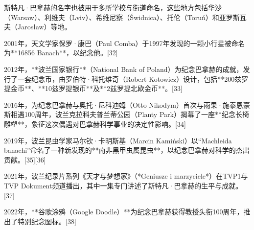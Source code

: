 斯特凡·巴拿赫的名字也被用于多所学校与街道命名，这些地方包括华沙（Warsaw）、利维夫（Lviv）、希维尼察（Świdnica）、托伦（Toruń）和亚罗斯瓦夫（Jarosław）等地。

2001年，天文学家保罗·康巴（Paul Comba）于1997年发现的一颗小行星被命名为**16856 Banach**，以纪念他。[32]

2012年，**波兰国家银行**（National Bank of Poland）为纪念巴拿赫的成就，发行了一套纪念币，由罗伯特·科托维奇（Robert Kotowicz）设计，包括**200兹罗提金币**、**10兹罗提银币**及**2兹罗提北欧金币**。[33]

2016年，为纪念巴拿赫与奥托·尼科迪姆（Otto Nikodym）首次与雨果·施泰恩豪斯相遇100周年，波兰克拉科夫普兰蒂公园（Planty Park）揭幕了一座**纪念长椅雕塑**，象征这次偶遇对巴拿赫科学事业的决定性影响。[34]

2019年，波兰昆虫学家马尔钦·卡明斯基（Marcin Kamiński）以“Machleida banachi”命名了一种新发现的**南非黑甲虫属昆虫**，以纪念巴拿赫对科学的杰出贡献。[35][36]

2021年，波兰纪录片系列《天才与梦想家》（*Geniusze i marzyciele*）在TVP1与TVP Dokument频道播出，其中一集专门讲述了斯特凡·巴拿赫的生平与成就。[37]

2022年，**谷歌涂鸦（Google Doodle）**为纪念巴拿赫获得教授头衔100周年，推出了特别纪念图标。[38]

